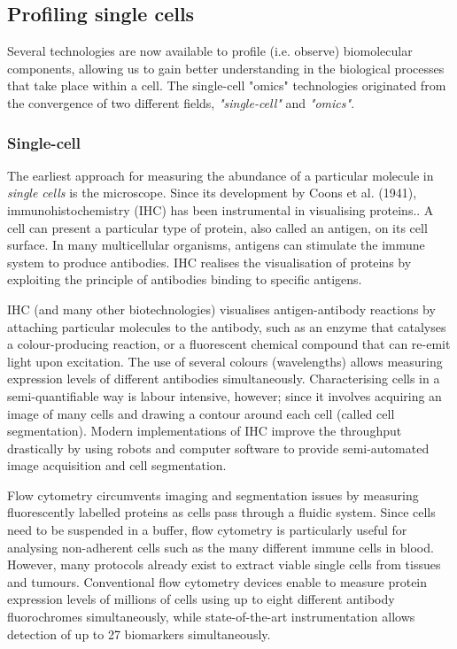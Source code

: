 
\subsection{Profiling single cells}
Several technologies are now available to profile (i.e. observe) biomolecular components, allowing us to gain better understanding in the biological processes that take place within a cell. The single-cell "omics" technologies originated from the convergence of two different fields, \emph{"single-cell"} and \emph{"omics"}.

\subsubsection{Single-cell}
The earliest approach for measuring the abundance of a particular molecule in \emph{single cells} is the microscope.
Since its development by Coons et al. (1941), immunohistochemistry (IHC) has been instrumental in visualising proteins.\cite{coons_immunologicalpropertiesantibody_1941}. 
A cell can present a particular type of protein, also called an antigen, on its cell surface. In many multicellular organisms, antigens can stimulate the immune system to produce antibodies. IHC realises the visualisation of proteins by exploiting the principle of antibodies binding to specific antigens.

IHC (and many other biotechnologies) visualises antigen-antibody reactions by attaching particular molecules to the antibody, such as an enzyme that catalyses a colour-producing reaction, or a fluorescent chemical compound that can re-emit light upon excitation. The use of several colours (wavelengths) allows measuring expression levels of different antibodies simultaneously. Characterising cells in a semi-quantifiable way is labour intensive, however; since it involves acquiring an image of many cells and drawing a contour around each cell (called cell segmentation).
Modern implementations of IHC improve the throughput drastically by using robots and computer software to provide semi-automated image acquisition and cell segmentation\cite{theodosiou_automatedanalysisfish_2007}.

Flow cytometry\cite{fulwyler_electronicseparationbiological_1965} circumvents imaging and segmentation issues by measuring fluorescently labelled proteins as cells pass through a fluidic system.
Since cells need to be suspended in a buffer, flow cytometry is particularly useful for analysing non-adherent cells such as the many different immune cells in blood. However, many protocols already exist to extract viable single cells from tissues and tumours\cite{leelatian_preparingviablesingle_2017}.
Conventional flow cytometry devices enable to measure protein expression levels of millions of cells using up to eight different antibody fluorochromes simultaneously, while state-of-the-art instrumentation allows detection of up to 27 biomarkers simultaneously\cite{cossarizza_guidelinesuseflow_2017}.

